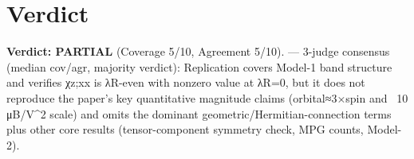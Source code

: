\documentclass[11pt]{article}
\begin{document}
\section{Verdict}
\textbf{Verdict: PARTIAL} (Coverage 5/10, Agreement 5/10). — 3-judge consensus (median cov/agr, majority verdict): Replication covers Model-1 band structure and verifies χz;xx is λR-even with nonzero value at λR=0, but it does not reproduce the paper’s key quantitative magnitude claims (orbital≈3×spin and ~10 μB/V^2 scale) and omits the dominant geometric/Hermitian-connection terms plus other core results (tensor-component symmetry check, MPG counts, Model-2).
\end{document}
